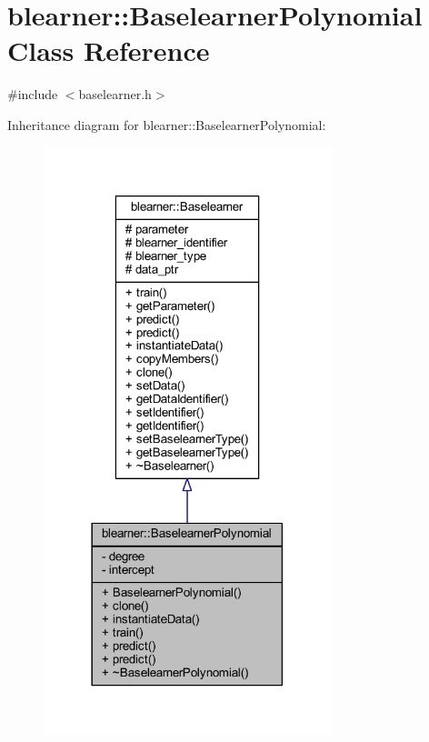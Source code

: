 \hypertarget{classblearner_1_1_baselearner_polynomial}{}\section{blearner\+:\+:Baselearner\+Polynomial Class Reference}
\label{classblearner_1_1_baselearner_polynomial}


{\ttfamily \#include $<$baselearner.\+h$>$}



Inheritance diagram for blearner\+:\+:Baselearner\+Polynomial\+:
\nopagebreak
\begin{figure}[H]
\begin{center}
\leavevmode
\includegraphics[width=237pt]{classblearner_1_1_baselearner_polynomial__inherit__graph}
\end{center}
\end{figure}


